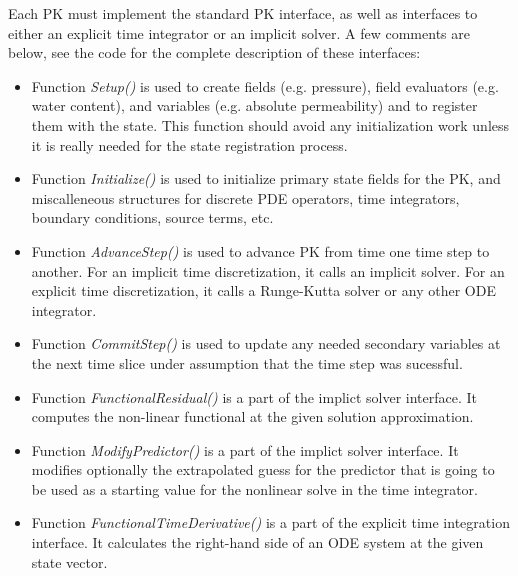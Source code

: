 Each PK must implement the standard PK interface, as well as interfaces to either 
an explicit time integrator or an implicit solver.
A few comments are below, see the code for the complete description of these interfaces:
\begin{itemize}
\item Function {\it Setup()} is used to create fields (e.g. pressure), field evaluators
      (e.g. water content), and variables (e.g.
      absolute permeability) and to register them with the state.
      This function should avoid any initialization work unless it is really needed
      for the state registration process.

\item Function {\it Initialize()} is used to initialize primary state fields for the PK,
      and miscalleneous structures for discrete PDE operators, time integrators, 
      boundary conditions, source terms, etc.

\item Function {\it AdvanceStep()} is used to advance PK from time one time step to another.
      For an implicit time discretization, it calls an implicit solver.
      For an explicit time discretization, it calls a Runge-Kutta solver or any other ODE
      integrator.

\item Function {\it CommitStep()} is used to update any needed secondary variables at 
      the next time slice under assumption that the time step was sucessful. 

\item Function {\it FunctionalResidual()} is a part of the implict solver interface.
      It computes the non-linear functional at the given solution approximation.

\item Function {\it ModifyPredictor()} is a part of the implict solver interface.
      It modifies optionally the extrapolated guess for the predictor that is going to 
      be used as a starting value for the nonlinear solve in the time integrator.

\item Function {\it FunctionalTimeDerivative()} is a part of the explicit time integration
      interface. It calculates the right-hand side of an ODE system at the given state vector.
\end{itemize}

